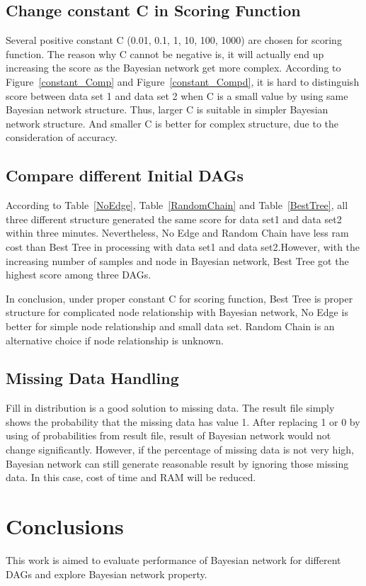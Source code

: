 \documentclass{article}
\begin{document}
\subsection{Change constant C in Scoring Function}

Several positive constant C (0.01, 0.1, 1, 10, 100, 1000) are chosen for scoring function. The reason why C cannot be negative is, it will actually end up increasing the score as the Bayesian network get more complex.
According to Figure~\ref{constant_Comp} and Figure~\ref{constant_Compd}, it is hard to distinguish score between data set 1 and data set 2 when C is a small value by using same Bayesian network structure. 
Thus, larger C is suitable in simpler Bayesian network structure. And smaller C is better for complex structure, due to the consideration of accuracy. 

\subsection{Compare different Initial DAGs}
According to Table~\ref{NoEdge}, Table~\ref{RandomChain} and Table~\ref{BestTree}, all three different structure generated the same score for data set1 and data set2 within three minutes. Nevertheless, No Edge and Random Chain have less ram cost than Best Tree in processing with data set1 and data set2.However, with the increasing number of samples and node in Bayesian network, Best Tree got the highest score among three DAGs. 

In conclusion, under proper constant C for scoring function, Best Tree is proper structure for complicated node relationship with Bayesian network, No Edge is better for simple node relationship and small data set. Random Chain is an alternative choice if node relationship is unknown.

\subsection{Missing Data Handling}
Fill in distribution is a good solution to missing data. The result file simply shows the probability that the missing data has value 1. After replacing 1 or 0 by using of probabilities from result file, result of Bayesian network would not change significantly. However, if the percentage of missing data is not very high, Bayesian network can still generate reasonable result by ignoring those missing data. In this case, cost of time and RAM will be reduced. 

\section{Conclusions} 
This work is aimed to evaluate performance of Bayesian network for different DAGs and explore Bayesian network property. 
\end{document}
